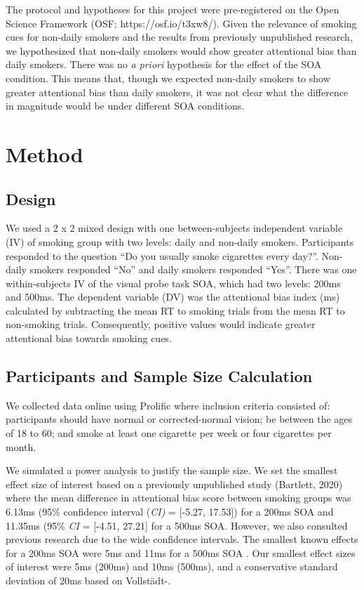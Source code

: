\documentclass[empirical, authordate]{jote-new-article}
\begin{document}
The protocol and hypotheses for this project were pre-registered on the Open Science Framework (OSF; https://osf.io/t3xw8/). Given the relevance of smoking cues for non-daily smokers and the results from previously unpublished research, we hypothesized that non-daily smokers would show greater attentional bias than daily smokers. There was no \emph{a priori} hypothesis for the effect of the SOA condition. This means that, though we expected non-daily smokers to show greater attentional bias than daily smokers, it was not clear what the difference in magnitude would be under different SOA conditions.

\section{Method}

\subsection{Design}

We used a 2 x 2 mixed design with one between-subjects independent variable (IV) of smoking group with two levels: daily and non-daily smokers. Participants responded to the question “Do you usually smoke cigarettes every day?”. Non-daily smokers responded “No” and daily smokers responded “Yes”. There was one within-subjects IV of the visual probe task SOA, which had two levels: 200ms and 500ms. The dependent variable (DV) was the attentional bias index (ms) calculated by subtracting the mean RT to smoking trials from the mean RT to non-smoking trials. Consequently, positive values would indicate greater attentional bias towards smoking cues.

\subsection{Participants and Sample Size Calculation}

We collected data online using Prolific where inclusion criteria consisted of: participants should have normal or corrected-normal vision; be between the ages of 18 to 60; and smoke at least one cigarette per week or four cigarettes per month.

We simulated a power analysis to justify the sample size. We set the smallest effect size of interest based on a previously unpublished study (Bartlett, 2020) where the mean difference in attentional bias score between smoking groups was 6.13ms (95\% confidence interval (\emph{CI)} = [-5.27, 17.53]) for a 200ms SOA and 11.35ms (95\% \emph{CI} = [-4.51, 27.21] for a 500ms SOA. However, we also consulted previous research due to the wide confidence intervals. The smallest known effects for a 200ms SOA were 5ms \parencite{Chanon2010} and 11ms for a 500ms SOA \parencite{Bradley2003}. Our smallest effect sizes of interest were 5ms (200ms) and 10ms (500ms), and a conservative standard deviation of 20ms based on Vollstädt-\parencite{Vollstädt-Klein2011}.
\end{document}
